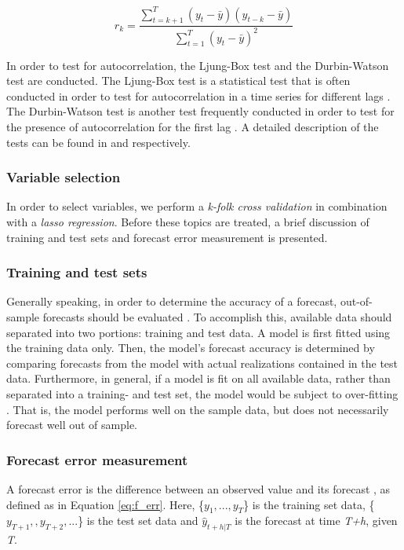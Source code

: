 \begin{equation}\label{eq:rk}
    r_k = \frac{\sum_{t=k+1}^T(y_t-\bar{y})(y_{t-k}-\bar{y})}{\sum_{t=1}^T(y_t-\bar{y})^2}
\end{equation}

In order to test for autocorrelation, the Ljung-Box test and the Durbin-Watson test are conducted. The Ljung-Box test is a statistical test that is often conducted in order to test for autocorrelation in a time series for different lags \citep{Hyndman}. The Durbin-Watson test is another test frequently conducted in order to test for the presence of autocorrelation for the first lag \citep{Carol_1}. A detailed description of the tests can be found in \cite{Hyndman} and \cite{Carol_1} respectively.

\subsubsection{Variable selection}

In order to select variables, we perform a \textit{k-folk cross validation} in combination with a \textit{lasso regression}. Before these topics are treated, a brief discussion of training and test sets and forecast error measurement is presented.


\subsubsection{Training and test sets}
Generally speaking, in order to determine the accuracy of a forecast, out-of-sample forecasts should be evaluated \citep{Hyndman}. To accomplish this, available data should separated into two portions: training and test data. A model is first fitted using the training data only. Then, the model's forecast accuracy is determined by comparing forecasts from the model with actual realizations contained in the test data. Furthermore, in general, if a model is fit on all available data, rather than separated into a training- and test set, the model would be subject to over-fitting \citep{Hyndman}. That is, the model performs well on the sample data, but does not necessarily forecast well out of sample.

\subsubsection{Forecast error measurement}
A forecast error is the difference between an observed value and its forecast \citep{Hyndman}, as defined as in Equation \ref{eq:f_err}. Here, \{$ y_{1},...,y_{T} $\} is the training set data, \{$ y_{T+1},,y_{T+2},...$\} is the test set data and $\hat{y}_{t+h|T}$ is the forecast at time \textit{T+h}, given \textit{T}. 

